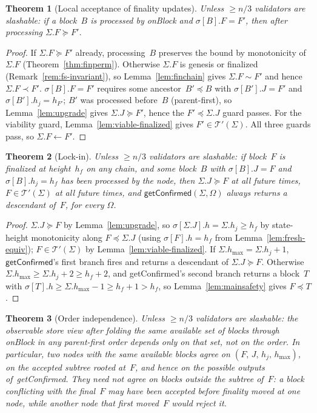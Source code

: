\ifx\litemode\undefined\documentclass{article}\fi
\newcommand{\hmax}{\ensuremath{h_{\max}}\xspace}
\newcommand{\viableTree}{\ensuremath{\mathcal{T}'}}
\newcommand{\onBlock}{\textsf{onBlock}\xspace}
\newcommand{\getConfirmed}{\textsf{getConfirmed}\xspace}
\theoremstyle{plain}
\newtheorem{theorem}{Theorem}
\theoremstyle{definition}
\theoremstyle{remark}
\begin{document}
\begin{theorem}[Local acceptance of finality updates]\label{thm:finlive}
Unless $\geq n/3$ validators are slashable: if a block~$B$ is processed by \onBlock and $\sigma[B].F = F'$, then after processing $\Sigma.F \succeq F'$.
\end{theorem}

\begin{proof}
If $\Sigma.F \succeq F'$ already, processing~$B$ preserves the bound by monotonicity of~$\Sigma.F$ (Theorem~\ref{thm:finperm}).
Otherwise $\Sigma.F$ is genesis or finalized (Remark~\ref{rem:fs-invariant}), so Lemma~\ref{lem:finchain} gives $\Sigma.F \sim F'$ and hence $\Sigma.F \prec F'$.
$\sigma[B].F = F'$ requires some ancestor~$B' \preceq B$ with $\sigma[B'].J = F'$ and $\sigma[B'].h_j = h_{F'}$; $B'$ was processed before~$B$ (parent-first), so Lemma~\ref{lem:upgrade} gives $\Sigma.J \succeq F'$, hence the $F' \preceq \Sigma.J$ guard passes.
For the viability guard, Lemma~\ref{lem:viable-finalized} gives $F' \in \viableTree(\Sigma)$.
All three guards pass, so $\Sigma.F \gets F'$.
\end{proof}

\begin{theorem}[Lock-in]\label{thm:lockin}
Unless $\geq n/3$ validators are slashable: if block~$F$ is finalized at height~$h_f$ on any chain, and some block~$B$ with $\sigma[B].J = F$ and $\sigma[B].h_j = h_f$ has been processed by the node, then $\Sigma.J \succeq F$ at all future times, $F \in \viableTree(\Sigma)$ at all future times, and $\getConfirmed(\Sigma, \Omega)$ always returns a descendant of~$F$, for every $\Omega$.
\end{theorem}

\begin{proof}
$\Sigma.J \succeq F$ by Lemma~\ref{lem:upgrade}, so $\sigma[\Sigma.J].h = \Sigma.h_j \geq h_f$ by state-height monotonicity along $F \preceq \Sigma.J$ (using $\sigma[F].h = h_f$ from Lemma~\ref{lem:fresh-equiv}); $F \in \viableTree(\Sigma)$ by Lemma~\ref{lem:viable-finalized}.
If $\Sigma.\hmax = \Sigma.h_j + 1$, $\getConfirmed$'s first branch fires and returns a descendant of $\Sigma.J \succeq F$.
Otherwise $\Sigma.\hmax \geq \Sigma.h_j + 2 \geq h_f + 2$, and \getConfirmed's second branch returns a block~$T$ with $\sigma[T].h \geq \Sigma.\hmax - 1 \geq h_f + 1 > h_f$, so Lemma~\ref{lem:mainsafety} gives $F \preceq T$.
\end{proof}

\begin{theorem}[Order independence]\label{thm:orderindep}
Unless $\geq n/3$ validators are slashable: the observable store view after folding the same available set of blocks through \onBlock in any parent-first order depends only on that set, not on the order.
In particular, two nodes with the same available blocks agree on $(F,\,J,\,h_j,\,\hmax)$, on the accepted subtree rooted at~$F$, and hence on the possible outputs of~\getConfirmed.
They need not agree on blocks outside the subtree of~$F$: a block conflicting with the final~$F$ may have been accepted before finality moved at one node, while another node that first moved~$F$ would reject it.
\end{theorem}
\end{document}
